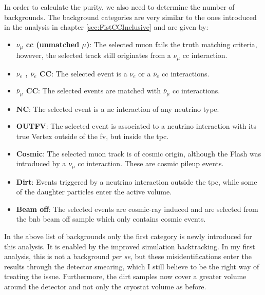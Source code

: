 In order to calculate the purity, we also need to determine the number of backgrounds. The background categories are very similar to the ones introduced in the analysis in chapter \ref{sec:FistCCInclusive} and are given by:
\begin{itemize}
    \item \textbf{$\nu_{\mu}$ \gls{cc} (unmatched $\mu$)}: The selected muon fails the truth matching criteria, however, the selected track still originates from a $\nu_{\mu}$ \gls{cc} interaction. 
    \item \textbf{$\nu_e$ , $\bar{\nu}_e$ CC}: The selected event is a $\nu_e$ or a $\bar{\nu}_e$ \gls{cc} interactions.
    \item \textbf{$\bar{\nu}_{\mu}$ CC}: The selected events are matched with $\bar{\nu}_{\mu}$ \gls{cc} interactions.
    \item \textbf{NC}: The selected event is a \gls{nc} interaction of any neutrino type.
    \item \textbf{OUTFV}: The selected event is associated to a neutrino interaction with its true \gls{Vertex} outside of the \gls{fv}, but inside the \gls{tpc}.
    \item \textbf{Cosmic}: The selected muon track is of cosmic origin, although the \gls{Flash} was introduced by a $\nu_{\mu}$ \gls{cc} interaction. These are cosmic pileup events.
    \item \textbf{Dirt}: Events triggered by a neutrino interaction outside the \gls{tpc}, while some of the daughter particles enter the active volume.
    \item \textbf{Beam off}: The selected events are cosmic-ray induced and are selected from the \gls{bnb} beam off sample which only contains cosmic events.
\end{itemize}
In the above list of backgrounds only the first category is newly introduced for this analysis. It is enabled by the improved simulation backtracking. In my first analysis, this is not a background \textit{per se}, but these misidentifications enter the results through the detector smearing, which I still believe to be the right way of treating the issue. Furthermore, the dirt samples now cover a greater volume around the detector and not only the cryostat volume as before.

